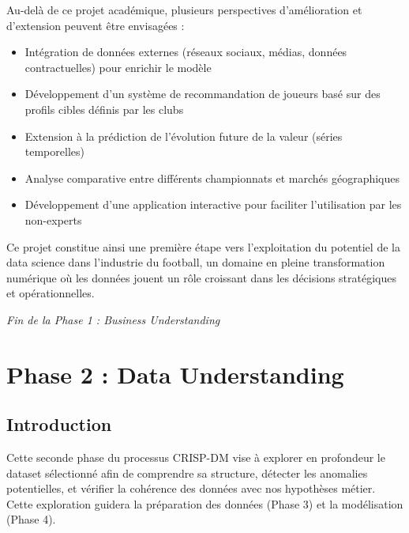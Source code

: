 \documentclass[12pt,a4paper]{article}
\begin{document}
Au-delà de ce projet académique, plusieurs perspectives d'amélioration et d'extension peuvent être envisagées :

\begin{itemize}[leftmargin=*]
    \item Intégration de données externes (réseaux sociaux, médias, données contractuelles) pour enrichir le modèle
    \item Développement d'un système de recommandation de joueurs basé sur des profils cibles définis par les clubs
    \item Extension à la prédiction de l'évolution future de la valeur (séries temporelles)
    \item Analyse comparative entre différents championnats et marchés géographiques
    \item Développement d'une application interactive pour faciliter l'utilisation par les non-experts
\end{itemize}

Ce projet constitue ainsi une première étape vers l'exploitation du potentiel de la data science dans l'industrie du football, un domaine en pleine transformation numérique où les données jouent un rôle croissant dans les décisions stratégiques et opérationnelles.

\vspace{1cm}

\begin{center}
\textit{Fin de la Phase 1 : Business Understanding}
\end{center}

\newpage


\section{Phase 2 : Data Understanding}

\subsection{Introduction}

Cette seconde phase du processus CRISP-DM vise à explorer en profondeur le dataset sélectionné afin de comprendre sa structure, détecter les anomalies potentielles, et vérifier la cohérence des données avec nos hypothèses métier. Cette exploration guidera la préparation des données (Phase 3) et la modélisation (Phase 4).
\end{document}
